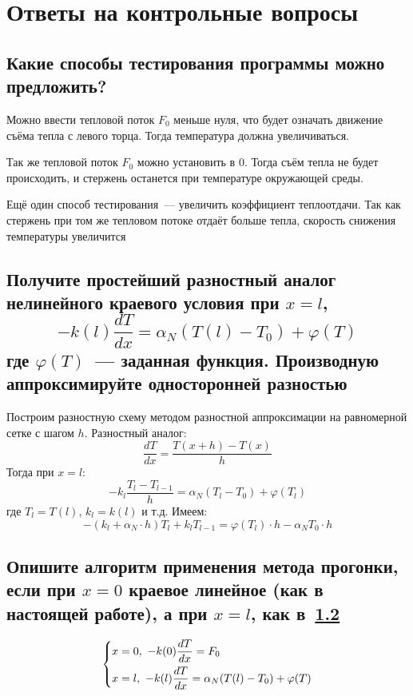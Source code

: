 \chapter{Ответы на контрольные вопросы}

\section{Какие способы тестирования программы можно предложить?}
Можно ввести тепловой поток $F_0$ меньше нуля, что будет означать движение съёма тепла с левого торца. Тогда температура должна увеличиваться.

Так же тепловой поток $F_0$ можно установить в 0. Тогда съём тепла не будет происходить, и стержень останется при температуре окружающей среды.

Ещё один способ тестирования~--- увеличить коэффициент теплоотдачи. Так как стержень при том же тепловом потоке отдаёт больше тепла, скорость снижения температуры увеличится

\section{Получите простейший разностный аналог нелинейного краевого условия при $x = l$, \[-k(l)\frac{dT}{dx}=\alpha_N(T(l)-T_0)+\varphi(T)\] где $\varphi(T)$~--- заданная функция. Производную аппроксимируйте односторонней разностью}\label{question02}
Построим разностную схему методом разностной аппроксимации на равномерной сетке с шагом $h$. Разностный аналог:
\begin{equation*}
	\frac{dT}{dx} = \frac{T(x + h) - T(x)}{h}
\end{equation*}
Тогда при $x = l$:
\begin{equation*}
	-k_l \frac{T_l - T_{l - 1}}{h} = \alpha_N (T_l - T_0) + \varphi(T_l)
\end{equation*}
где $T_l = T(l)$, $k_l = k(l)$ и т.д. Имеем:
\begin{equation*}
    -(k_l + \alpha_N \cdot h) T_{l} + k_l T_{l-1} = \varphi(T_l) \cdot h -\alpha_N T_0 \cdot h
\end{equation*}

\section{Опишите алгоритм применения метода прогонки, если при $x = 0$ краевое линейное (как в настоящей работе), а при $x = l$, как в~\ref{question02}}
\begin{equation*}
 \begin{dcases}
   x=0,~-k(0)\frac{dT}{dx}=F_0
   \\
   x =l,~-k(l)\frac{dT}{dx}=\alpha_N(T(l)-T_0) + \varphi(T)
 \end{dcases}
\end{equation*}

